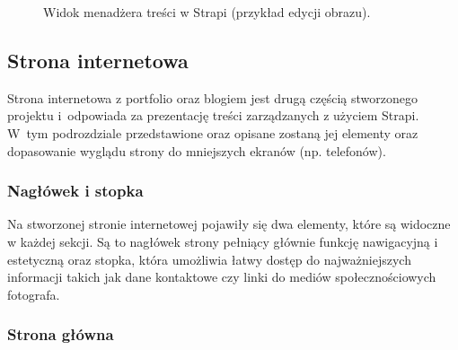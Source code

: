 \documentclass[a4paper, 12pt]{article}
\numberwithin{figure}{section}
\begin{document}
\begin{sloppypar}
\begin{figure}[H] 
    \centering
   \caption{Widok menadżera treści w Strapi (przykład edycji obrazu).}
   \label{fig:strapi-use-5.jpg}
\end{figure}


\subsection{Strona internetowa} \label{next-use}

Strona internetowa z portfolio oraz blogiem jest drugą częścią stworzonego projektu i~odpowiada za prezentację treści zarządzanych z użyciem Strapi. W~tym podrozdziale przedstawione oraz opisane zostaną jej elementy oraz dopasowanie wyglądu strony do mniejszych ekranów (np. telefonów). 

\subsubsection*{Nagłówek i stopka}

Na stworzonej stronie internetowej pojawiły się dwa elementy, które są widoczne w każdej sekcji. Są to nagłówek strony pełniący głównie funkcję nawigacyjną i estetyczną oraz stopka, która umożliwia łatwy dostęp do najważniejszych informacji 
takich jak dane kontaktowe czy linki do mediów społecznościowych fotografa. 

\subsubsection*{Strona główna}


\end{sloppypar}
\end{document}
